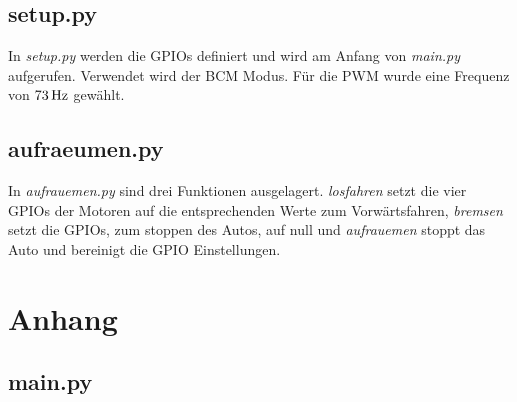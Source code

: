 \documentclass[a4paper, 12pt]{scrartcl}
\begin{document}
\subsection{setup.py}	%


In \textit{setup.py} werden die GPIOs definiert und wird am Anfang von \textit{main.py} aufgerufen. Verwendet wird der BCM Modus. Für die PWM wurde eine Frequenz von $\unit[73]{Hz}$ gewählt.

\subsection{aufraeumen.py}	%


In \textit{aufrauemen.py} sind drei Funktionen ausgelagert. \textit{losfahren} setzt die vier GPIOs der Motoren auf die entsprechenden Werte zum Vorwärtsfahren, \textit{bremsen} setzt die GPIOs, zum stoppen des Autos, auf null und \textit{aufrauemen} stoppt das Auto und bereinigt die GPIO Einstellungen.

\section{Anhang}

\subsection{main.py}

\end{document}
